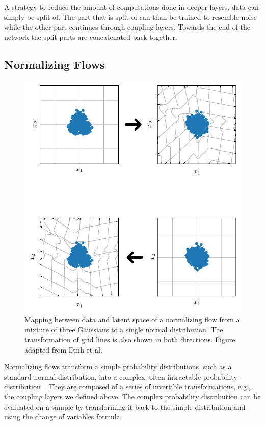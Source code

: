 A strategy to reduce the amount of computations done in deeper layers, data can
simply be split of. The part that is split of can than be trained to resemble
noise while the other part continues through coupling layers. Towards the end
of the network the split parts are concatenated back together.


\subsection{Normalizing Flows}%
\label{sub:normalizing_flows}

\begin{figure}[htpb]
    \centering
    \includegraphics{figures/toy_example/gaussian_mixture/grid_transformed.pdf}
    \caption{Mapping between data and latent space of a normalizing flow from a
    mixture of three Gaussians to a single normal distribution. The
transformation of grid lines is also shown in both directions. Figure adapted
from Dinh et al.~\citep{dinhDensityEstimationUsing2017}}%
    \label{fig:normalizing_flow_mapping}
\end{figure}

Normalizing flows transform a simple probability distributions, such as a
standard normal distribution, into a complex, often intractable probability
distribution~\citep{kobyzevNormalizingFlowsIntroduction2020}. They are composed
of a series of invertible transformations, e.g., the coupling layers we defined
above. The complex probability distribution can be evaluated on a sample by
transforming it back to the simple distribution and using the change of
variables formula.

